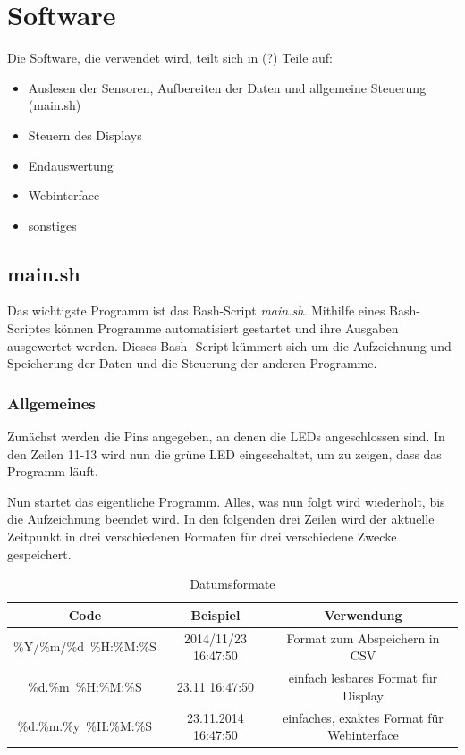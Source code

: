 \chapter{Software}
Die Software, die verwendet wird, teilt sich in (?) Teile auf:
\begin{itemize}
\item Auslesen der Sensoren, Aufbereiten der Daten und allgemeine Steuerung (main.sh)
\item Steuern des Displays
\item Endauswertung
\item Webinterface
\item sonstiges
\end{itemize}

\section{main.sh}
\label{sec:main.sh}

Das wichtigste Programm ist das Bash-Script \textit{main.sh}. Mithilfe eines Bash-Scriptes können Programme automatisiert gestartet und ihre Ausgaben ausgewertet werden. Dieses Bash- Script kümmert sich um die Aufzeichnung und Speicherung der Daten und die Steuerung der anderen Programme. 

\subsection{Allgemeines}
\label{subsec:main.sh/allgemeines}

Zunächst werden die Pins angegeben, an denen die LEDs angeschlossen sind. In den Zeilen 11-13 wird nun die grüne LED eingeschaltet, um zu zeigen, dass das Programm läuft.

Nun startet das eigentliche Programm. Alles, was nun folgt wird wiederholt, bis die Aufzeichnung beendet wird.
In den folgenden drei Zeilen wird der aktuelle Zeitpunkt in drei verschiedenen Formaten für drei verschiedene Zwecke gespeichert.
\begin{table}[h]
	\centering
	\begin{tabulary}{\textwidth}{C|C|C}
		Code & Beispiel & Verwendung \\
		\hline
		\hline
		\%Y/\%m/\%d\ \%H:\%M:\%S & 2014/11/23 16:47:50 & Format zum Abspeichern in \gls{CSV} \\
		\hline
		\%d.\%m\ \%H:\%M:\%S & 23.11 16:47:50 & einfach lesbares Format für Display \\
		\hline
		\%d.\%m.\%y\ \%H:\%M:\%S & 23.11.2014 16:47:50 & einfaches, exaktes Format für Webinterface \\
	\end{tabulary}
	\caption{Datumsformate}
\end{table}

